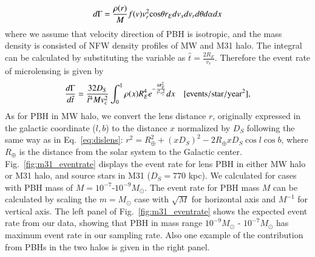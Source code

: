 \documentclass[iop, apj]{emulateapj}
\newcommand{\?}{\stackrel{?}{=}}
\begin{document}
%
\begin{eqnarray}
d\Gamma=\frac{\rho(r)}{M}f(v)v^2_r {\rm cos}\theta r_E dv_xdv_rd\theta d\alpha dx %
\end{eqnarray}
%
where we assume that velocity direction of PBH is isotropic, and the mass density is consisted of 
NFW density profiles of MW and M31 halo. The integral can be calculated by substituting the variable as $\hat t=\frac{2R_E}{v_r}$. Therefore the event rate of microlensing is given by 
%
\begin{eqnarray}
\frac{d\Gamma}{d\hat t}=\frac{32D_S}{\hat t^4 Mv_c^2}\int^1_0 \rho(x) R^4_E e^{-\frac{4R^2_E}{\hat t^2 v^2_c}} dx \quad[\rm {events/star/year^2}],
\label{eq:evrate}
\end{eqnarray}
%
As for PBH in MW halo, we convert the lens distance $r$, originally expressed in the galactic coordinate ($l,b$) to the distance $x$ normalized by $D_S$ following the same way as in Eq.~\ref{eq:dislens}: $r^2=R^2_\oplus+(xD_S)^2-2R_\oplus xD_S{\cos}l{\cos}b$, where $R_\oplus$ is the distance from the solar system to the Galactic center. 
Fig.~\ref{fig:m31_eventrate} displays the event rate for lens PBH in either MW halo or M31 halo, and source stars in M31 ($D_S=770$ {kpc}). We calculated for cases with PBH mass of $M=10^{-7}$-$10^{-9}M_\odot$. The event rate for PBH mass $M$ can be calculated by scaling the $m=M_\odot$ case with $\sqrt{M}$ for horizontal axis and $M^{-1}$ for vertical axis. The left panel of Fig.~\ref{fig:m31_eventrate} shows the expected event rate from our data, showing that PBH in mass range $10^{-9}M_\odot$ - $10^{-7}M_\odot$ has maximum event rate in our sampling rate. Also one example of the contribution from PBHs in the two halos is given in the right panel. 
%
\end{document}
